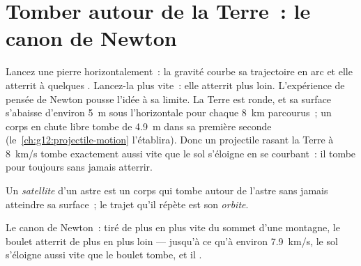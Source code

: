 \section{Tomber autour de la Terre~: le canon de Newton}

Lancez une pierre horizontalement~: la gravité courbe sa trajectoire en
arc et elle atterrit à quelques . Lancez-la plus vite~: elle
atterrit plus loin. L'expérience de pensée de Newton pousse l'idée à sa
limite. La Terre est ronde, et sa surface s'abaisse d'environ
\qty{5}{m} sous l'horizontale pour chaque \qty{8}{km} parcourus~; un
corps en chute libre tombe de \qty{4.9}{m} dans sa première seconde
(le~\cref{ch:g12:projectile-motion} l'établira). Donc un projectile
rasant la Terre à \qty{8}{km/s} tombe exactement aussi vite que le sol
s'éloigne en se courbant~: il tombe pour toujours sans jamais atterrir.

\begin{definition}\label{def:g10:universal-gravitation:satellite}
Un \emph{satellite} d'un astre est un corps qui tombe
autour de l'astre sans jamais atteindre sa surface~; le trajet qu'il
répète est son \emph{orbite}.
\end{definition}

\begin{omfigure}

{\small Le canon de Newton~: tiré de plus en plus vite du sommet d'une
montagne, le boulet atterrit de plus en plus loin --- jusqu'à ce qu'à
environ \qty{7.9}{km/s}, le sol s'éloigne aussi vite que le boulet
tombe, et il .}
\end{omfigure}

